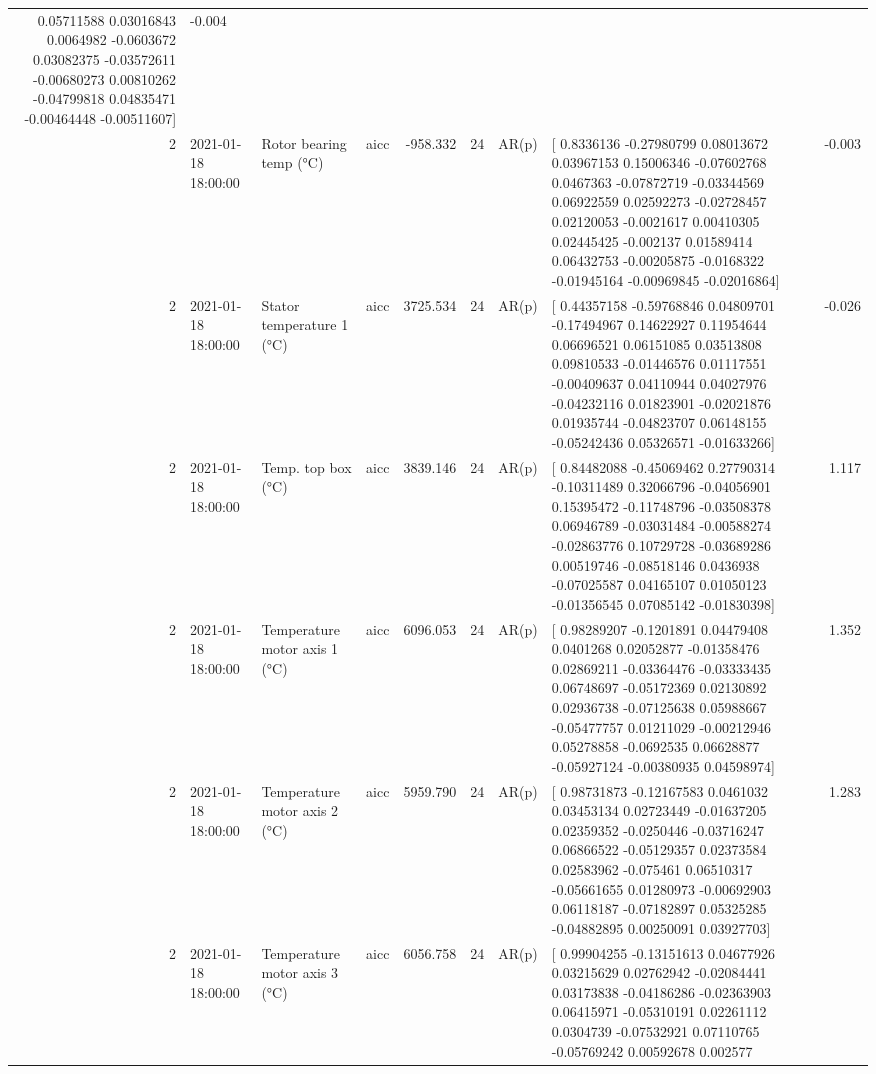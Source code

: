 \begin{tabular}{rlllrrllr}
  0.05711588  0.03016843  0.0064982  -0.0603672   0.03082375 -0.03572611
 -0.00680273  0.00810262 -0.04799818  0.04835471 -0.00464448 -0.00511607] & -0.004 \\
2 & 2021-01-18 18:00:00 & Rotor bearing temp (°C) & aicc & -958.332 & 24 & AR(p) & [ 0.8336136  -0.27980799  0.08013672  0.03967153  0.15006346 -0.07602768
  0.0467363  -0.07872719 -0.03344569  0.06922559  0.02592273 -0.02728457
  0.02120053 -0.0021617   0.00410305  0.02445425 -0.002137    0.01589414
  0.06432753 -0.00205875 -0.0168322  -0.01945164 -0.00969845 -0.02016864] & -0.003 \\
2 & 2021-01-18 18:00:00 & Stator temperature 1 (°C) & aicc & 3725.534 & 24 & AR(p) & [ 0.44357158 -0.59768846  0.04809701 -0.17494967  0.14622927  0.11954644
  0.06696521  0.06151085  0.03513808  0.09810533 -0.01446576  0.01117551
 -0.00409637  0.04110944  0.04027976 -0.04232116  0.01823901 -0.02021876
  0.01935744 -0.04823707  0.06148155 -0.05242436  0.05326571 -0.01633266] & -0.026 \\
2 & 2021-01-18 18:00:00 & Temp. top box (°C) & aicc & 3839.146 & 24 & AR(p) & [ 0.84482088 -0.45069462  0.27790314 -0.10311489  0.32066796 -0.04056901
  0.15395472 -0.11748796 -0.03508378  0.06946789 -0.03031484 -0.00588274
 -0.02863776  0.10729728 -0.03689286  0.00519746 -0.08518146  0.0436938
 -0.07025587  0.04165107  0.01050123 -0.01356545  0.07085142 -0.01830398] & 1.117 \\
2 & 2021-01-18 18:00:00 & Temperature motor axis 1 (°C) & aicc & 6096.053 & 24 & AR(p) & [ 0.98289207 -0.1201891   0.04479408  0.0401268   0.02052877 -0.01358476
  0.02869211 -0.03364476 -0.03333435  0.06748697 -0.05172369  0.02130892
  0.02936738 -0.07125638  0.05988667 -0.05477757  0.01211029 -0.00212946
  0.05278858 -0.0692535   0.06628877 -0.05927124 -0.00380935  0.04598974] & 1.352 \\
2 & 2021-01-18 18:00:00 & Temperature motor axis 2 (°C) & aicc & 5959.790 & 24 & AR(p) & [ 0.98731873 -0.12167583  0.0461032   0.03453134  0.02723449 -0.01637205
  0.02359352 -0.0250446  -0.03716247  0.06866522 -0.05129357  0.02373584
  0.02583962 -0.075461    0.06510317 -0.05661655  0.01280973 -0.00692903
  0.06118187 -0.07182897  0.05325285 -0.04882895  0.00250091  0.03927703] & 1.283 \\
2 & 2021-01-18 18:00:00 & Temperature motor axis 3 (°C) & aicc & 6056.758 & 24 & AR(p) & [ 0.99904255 -0.13151613  0.04677926  0.03215629  0.02762942 -0.02084441
  0.03173838 -0.04186286 -0.02363903  0.06415971 -0.05310191  0.02261112
  0.0304739  -0.07532921  0.07110765 -0.05769242  0.00592678  0.002577

\end{tabular}
